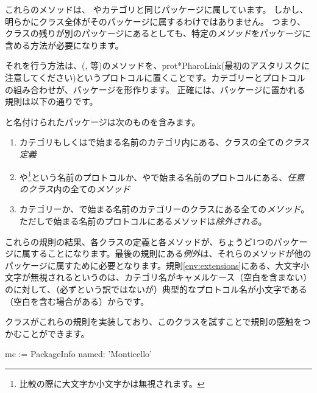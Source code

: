 \documentclass[a4paper,10pt,twoside]{book}
\begin{document}
\noindent
これらのメソッドは、
やカテゴリと同じパッケージに属しています。
しかし、明らかにクラス全体がそのパッケージに属するわけではありません。
つまり、クラスの残りが別のパッケージにあるとしても、特定の\emph{メソッド}をパッケージに含める方法が必要になります。


それを行う方法は、(,  等)のメソッドを、prot{*PharoLink}(最初のアスタリスクに注意してください)というプロトコルに置くことです。カテゴリーとプロトコルの組み合わせが、パッケージを形作ります。
正確には、パッケージに置かれる規則は以下の通りです。

と名付けられたパッケージは次のものを含みます。

\begin{enumerate} 
\item{} カテゴリもしくはで始まる名前のカテゴリ内にある、クラスの全ての\emph{クラス定義}
\item{} \label{env:extensions} や\footnote{比較の際に大文字か小文字かは無視されます。}という名前のプロトコルか、やで始まる名前のプロトコルにある、\emph{任意のクラス}内の全ての\emph{メソッド}
\item{} カテゴリーか、で始まる名前のカテゴリーのクラスにある全ての\emph{メソッド}。ただし\prot{*}で始まる名前のプロトコルにあるメソッドは\emph{除外される}。

\end{enumerate}
\noindent
これらの規則の結果、各クラスの定義と各メソッドが、ちょうど1つのパッケージに属することになります。最後の規則にある\emph{例外}は、それらのメソッドが他のパッケージに属すために必要となります。規則\ref{env:extensions}にある、大文字小文字が無視されるというのは、カテゴリ名がキャメルケース（空白を含まない）のに対して、（必ずという訳ではないが）典型的なプロトコル名が小文字である（空白を含む場合がある）からです。

クラスがこれらの規則を実装しており、このクラスを試すことで規則の感触をつかむことができます。


\begin{code}{}
mc := PackageInfo named: 'Monticello'
\end{code}
\end{document}
